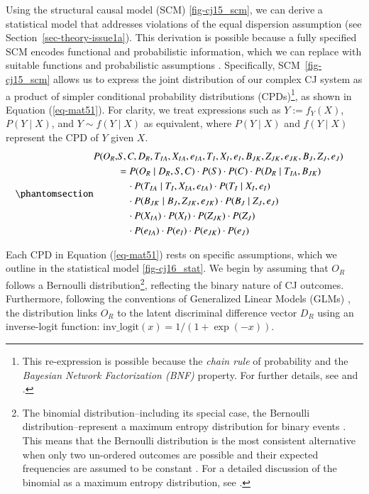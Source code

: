 \documentclass[
  authoryear,
  review,
  1p]{elsarticle}
\begin{document}
Using the structural causal model (SCM) \ref{fig-cj15_scm}, we can
derive a statistical model that addresses violations of the equal
dispersion assumption (see Section~\ref{sec-theory-issue1a}). This
derivation is possible because a fully specified SCM encodes functional
and probabilistic information, which we can replace with suitable
functions and probabilistic assumptions \citep{Pearl_et_al_2016}.
Specifically, SCM~\ref{fig-cj15_scm} allows us to express the joint
distribution of our complex CJ system as a product of simpler
conditional probability distributions (CPDs)\footnote{This re-expression
  is possible because the \emph{chain rule} of probability and the
  \emph{Bayesian Network Factorization (BNF)} property. For further
  details, see \citet{Pearl_et_al_2016} and \citet{Neal_2020}.}, as
shown in Equation (\ref{eq-mat51}). For clarity, we treat expressions
such as \(Y := f_{Y}(X)\), \(P(Y \mid X)\), and \(Y \sim f(Y \mid X)\)
as equivalent, where \(P(Y \mid X)\) and \(f(Y \mid X)\) represent the
CPD of \(Y\) given \(X\).
\begin{equation}\phantomsection\label{eq-mat51}{
\begin{aligned}
  P(O_{R}, & S, C, D_{R}, T_{IA}, X_{IA}, e_{IA}, T_{I}, X_{I}, e_{I}, B_{JK}, Z_{JK}, e_{JK}, B_{J}, Z_{J}, e_{J} ) & \\
  &= P(O_{R} \mid D_{R}, S, C) \cdot P(S) \cdot P(C) \cdot P(D_{R} \mid T_{IA}, B_{JK}) \\
  & \quad \cdot P(T_{IA} \mid T_{I}, X_{IA}, e_{IA}) \cdot P(T_{I} \mid X_{I}, e_{I}) \\
  & \quad \cdot P(B_{JK} \mid B_{J}, Z_{JK}, e_{JK}) \cdot P(B_{J} \mid Z_{J}, e_{J}) \\
  & \quad \cdot P(X_{IA}) \cdot P(X_{I}) \cdot P(Z_{JK}) \cdot P(Z_{J}) \\
  & \quad \cdot P(e_{IA}) \cdot P(e_{I}) \cdot P(e_{JK}) \cdot P(e_{J})  
\end{aligned}
}\end{equation}

Each CPD in Equation (\ref{eq-mat51}) rests on specific assumptions,
which we outline in the statistical model \ref{fig-cj16_stat}. We begin
by assuming that \(O_{R}\) follows a Bernoulli distribution\footnote{The
  binomial distribution--including its special case, the Bernoulli
  distribution--represent a maximum entropy distribution for binary
  events \citep[pp.~34]{McElreath_2020}. This means that the Bernoulli
  distribution is the most consistent alternative when only two
  un-ordered outcomes are possible and their expected frequencies are
  assumed to be constant \citep[pp.~310]{McElreath_2020}. For a detailed
  discussion of the binomial as a maximum entropy distribution, see
  \citet[sec.~10.1.2]{McElreath_2020}.}, reflecting the binary nature of
CJ outcomes. Furthermore, following the conventions of Generalized
Linear Models (GLMs)
\citep{Nelder_et_al_1983, Nelder_et_al_1996, Agresti_2015}, the
distribution links \(O_{R}\) to the latent discriminal difference vector
\(D_{R}\) using an inverse-logit function:
\(\text{inv\_logit}(x) = 1/(1 + \exp(-x))\).
\end{document}
